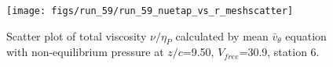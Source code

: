 \begin{figure}[H]
\centering
\texttt{[image: figs/run\_59/run\_59\_nuetap\_vs\_r\_meshscatter]}
\caption{Scatter plot of total viscosity $\nu / \eta_P$ calculated by mean $\bar{v}_{\theta}$ equation with non-equilibrium pressure at $z/c$=9.50, $V_{free}$=30.9, station 6.}
\label{fig:run_59_nuetap_vs_r_meshscatter}
\end{figure}


